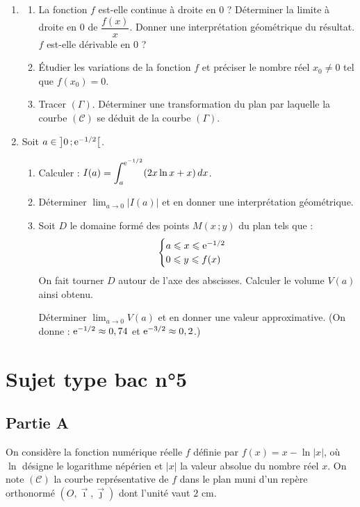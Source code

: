 \begin{enumerate}
	\item
	\begin{enumerate}
		\item La fonction $f$ est-elle continue à droite en $0$ ?
		Déterminer la limite à droite en $0$ de $\dfrac{f(x)}{x}$.
		Donner une interprétation géométrique du résultat.
		$f$ est-elle dérivable en $0$ ?
		\item Étudier les variations de la fonction $f$ et préciser le nombre réel $x_0 \neq 0$
		tel que $f(x_0) = 0$.
		\item Tracer $(\Gamma)$. Déterminer une transformation du plan par laquelle la courbe
		$(\mathscr{C})$ se déduit de la courbe $(\Gamma)$.
	\end{enumerate}

	\item Soit $a \in \left]0\,;\mathrm{e}^{-1/2}\right[$.
	\begin{enumerate}
		\item Calculer : $\displaystyle I(a) = \int_a^{\mathrm{e}^{-1/2}} (2x\ln x + x)\,dx$.
		\item Déterminer $\displaystyle\lim_{a\to0} |I(a)|$ et en donner une interprétation géométrique.
		\item Soit $D$ le domaine formé des points $M(x\,;y)$ du plan tels que :
		\[
		\begin{cases}
			a \leqslant x \leqslant \mathrm{e}^{-1/2} \\
			0 \leqslant y \leqslant f(x)
		\end{cases}
		\]
		On fait tourner $D$ autour de l'axe des abscisses. Calculer le volume $V(a)$ ainsi obtenu.

		Déterminer $\displaystyle\lim_{a\to0} V(a)$ et en donner une valeur approximative.
		(On donne : $\mathrm{e}^{-1/2} \approx 0,74$ et $\mathrm{e}^{-3/2} \approx 0,2$.)
	\end{enumerate}
\end{enumerate}


\section*{Sujet type bac n°5}

\subsection*{Partie A}

On considère la fonction numérique réelle $f$ définie par $f(x) = x - \ln|x|$, où $\ln$ désigne le logarithme népérien et $|x|$ la valeur absolue du nombre réel $x$. On note $(\mathscr{C})$ la courbe représentative de $f$ dans le plan muni d'un repère orthonormé $(O,\vec{\imath},\vec{\jmath})$ dont l'unité vaut $2$ cm.

